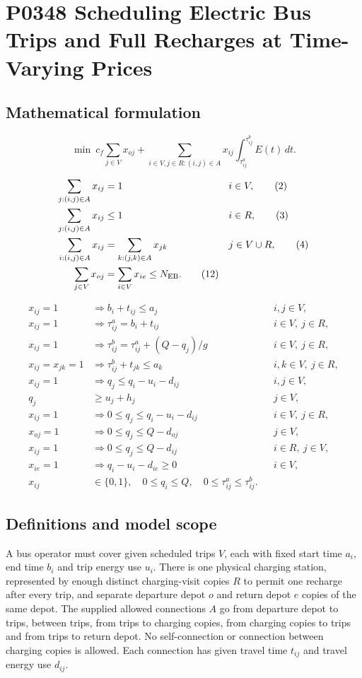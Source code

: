 \documentclass[10pt]{article}
\begin{document}
\section*{P0348 Scheduling Electric Bus Trips and Full Recharges at Time-Varying Prices}
\subsection*{Mathematical formulation}
\[
\min\ c_f\sum_{j\in V}x_{oj}
 +\sum_{i\in V,j\in R:(i,j)\in A}
  x_{ij}\int_{\tau^a_{ij}}^{\tau^b_{ij}}E(t)\,dt.\tag{1}
\]

\begin{align}
\sum_{j:(i,j)\in A}x_{ij}&=1 &&i\in V,\tag{2}\\
\sum_{j:(i,j)\in A}x_{ij}&\le1 &&i\in R,\tag{3}\\
\sum_{i:(i,j)\in A}x_{ij}&=\sum_{k:(j,k)\in A}x_{jk}
&&j\in V\cup R,\tag{4}\\
\sum_{j\in V}x_{oj}&=\sum_{i\in V}x_{ie}\le N_{\rm EB}.\tag{12}
\end{align}

\begin{align}
x_{ij}=1&\Longrightarrow b_i+t_{ij}\le a_j &&i,j\in V,\tag{5}\\
x_{ij}=1&\Longrightarrow \tau^a_{ij}=b_i+t_{ij} &&i\in V,\ j\in R,\tag{6}\\
x_{ij}=1&\Longrightarrow \tau^b_{ij}=\tau^a_{ij}+(Q-q_j)/g
&&i\in V,\ j\in R,\tag{7}\\
x_{ij}=x_{jk}=1&\Longrightarrow \tau^b_{ij}+t_{jk}\le a_k
&&i,k\in V,\ j\in R,\tag{8}\\
x_{ij}=1&\Longrightarrow q_j\le q_i-u_i-d_{ij} &&i,j\in V,\tag{9a}\\
q_j&\ge u_j+h_j &&j\in V,\tag{9b}\\
x_{ij}=1&\Longrightarrow 0\le q_j\le q_i-u_i-d_{ij}
&&i\in V,\ j\in R,\tag{10}\\
x_{oj}=1&\Longrightarrow 0\le q_j\le Q-d_{oj} &&j\in V,\tag{11a}\\
x_{ij}=1&\Longrightarrow 0\le q_j\le Q-d_{ij} &&i\in R,\ j\in V,\tag{11b}\\
x_{ie}=1&\Longrightarrow q_i-u_i-d_{ie}\ge0 &&i\in V,\tag{11c}\\
x_{ij}&\in\{0,1\},\quad 0\le q_i\le Q,\quad
0\le\tau^a_{ij}\le\tau^b_{ij}.\tag{13}
\end{align}

\subsection*{Definitions and model scope}
A bus operator must cover given scheduled trips $V$, each with fixed start time $a_i$, end time $b_i$ and trip energy use $u_i$. There is one physical charging station, represented by enough distinct charging-visit copies $R$ to permit one recharge after every trip, and separate departure depot $o$ and return depot $e$ copies of the same depot. The supplied allowed connections $A$ go from departure depot to trips, between trips, from trips to charging copies, from charging copies to trips and from trips to return depot. No self-connection or connection between charging copies is allowed. Each connection has given travel time $t_{ij}$ and travel energy use $d_{ij}$.
\end{document}
